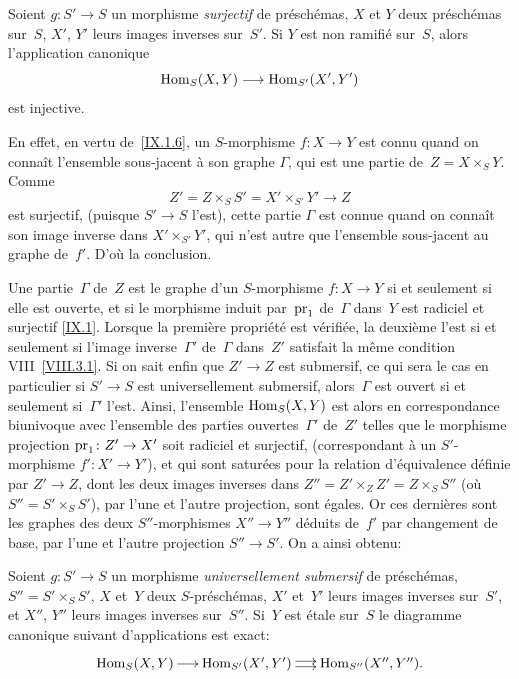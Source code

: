 \begin{proposition}
\label{IX.3.1}
Soient $g\colon S'\to S$ un morphisme \emph{surjectif} de
pr\'esch\'emas, $X$ et $Y$ deux pr\'esch\'emas sur~$S$, $X'$,
$Y'$ leurs images inverses sur~$S'$. Si $Y$ est non ramifi\'e sur~$S$, alors l'application canonique
$$
\Hom_S(X,Y) \to \Hom_{S'}(X',Y')
$$
est injective.
\end{proposition}

En effet, en vertu de~\ref{IX.1.6}, un $S$-morphisme $f\colon X\to Y$
est connu quand on conna\^it l'ensemble sous-jacent \`a son
graphe $\Gamma$, qui est une partie de~$Z=X\times_SY$. Comme
$$
Z'=Z\times_SS'=X'\times_{S'}Y' \to Z
$$
est surjectif, (puisque $S'\to S$ l'est), cette partie $\Gamma$ est
connue quand on conna\^it son image inverse dans $X'\times_{S'}Y'$,
qui n'est autre que l'ensemble sous-jacent au graphe de~$f'$. D'o\`u
la conclusion.

Une partie~$\Gamma$ de~$Z$ est le graphe d'un $S$-morphisme $f\colon
X\to Y$ si et seulement si elle est ouverte, et si le morphisme induit
par~$\mathrm{pr}_1$ de~$\Gamma$ dans~$Y$ est radiciel
et surjectif \cf \ref{IX.1}. Lorsque la premi\`ere
propri\'et\'e est v\'erifi\'ee, la deuxi\`eme l'est si et
seulement si l'image inverse~$\Gamma'$ de~$\Gamma$ dans~$Z'$ satisfait
la m\^eme condition VIII~\ref{VIII.3.1}. Si on sait enfin que
$Z'\to Z$ est submersif, ce qui sera le cas en particulier si $S'\to
S$ est universellement submersif, alors~$\Gamma$ est ouvert si et
seulement si~$\Gamma'$ l'est. Ainsi, l'ensemble $\operatorname{Hom}_S(X,Y)$ est
alors en correspondance biunivoque avec l'ensemble des parties
ouvertes~$\Gamma'$ de~$Z'$ telles que le morphisme projection
$\pr_1\colon Z'\to X'$ soit radiciel et surjectif, (\ie correspondant \`a un $S'$-morphisme $f'\colon X'\to Y'$), et qui
sont satur\'ees pour la relation d'\'equivalence d\'efinie par
$Z'\to Z$, \ie dont les deux images inverses dans $Z''=Z'\times_Z
Z'=Z\times_S S''$ (o\`u $S''=S'\times_S S'$), par l'une et l'autre
projection, sont \'egales. Or ces derni\`eres sont les graphes
des deux $S''$-morphismes $X''\to Y''$ d\'eduits de~$f'$ par
changement de base, par l'une et l'autre projection $S''\to S'$. On a
ainsi obtenu:

\begin{proposition}
\label{IX.3.2}
Soient $g\colon S'\to S$ un morphisme \emph{universellement submersif}
de pr\'esch\'emas, $S''=S'\times_S S'$, $X$ et~$Y$ deux
$S$-pr\'esch\'emas, $X'$ et~$Y'$ leurs images inverses sur~$S'$,
et $X''$, $Y''$ leurs images inverses sur~$S''$. Si~$Y$ est \'etale
sur~$S$ le diagramme canonique suivant d'applications est exact:
$$
\xymatrix@C=.5cm{{\mathrm{Hom}_S(X,Y)}\ar[r]&{\mathrm{Hom}_{S'}(X',Y')}\ar@<2pt>[r]\ar@<-2pt>[r]&{{\mathrm{Hom}_{S''}(X'',Y'')}.}}
$$
\end{proposition}


